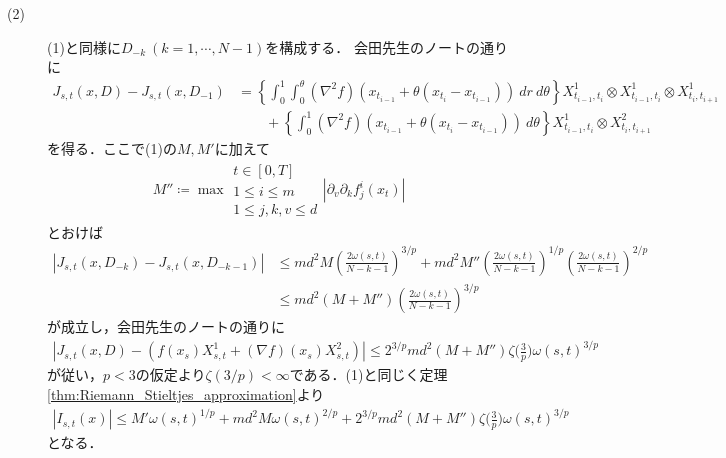 \begin{prf}
\begin{description}
			\item[(2)]
				(1)と同様に$D_{-k}\ (k=1,\cdots,N-1)$を構成する．
				会田先生のノートの通りに
				\begin{align}
					J_{s,t}(x,D) - J_{s,t}(x,D_{-1})
					&= \left\{ \int_0^1 \int_0^\theta (\nabla^2 f)(x_{t_{i-1}} + \theta (x_{t_i}- x_{t_{i-1}}))\ dr\ d\theta \right\}
						X^1_{t_{i-1},t_i} \otimes X^1_{t_{i-1},t_i} \otimes X^1_{t_i,t_{i+1}} \\
						&\qquad + \left\{ \int_0^1 (\nabla^2 f)(x_{t_{i-1}} + \theta (x_{t_i}- x_{t_{i-1}}))\ d\theta \right\}
						X^1_{t_{i-1},t_i} \otimes X^2_{t_i,t_{i+1}}
				\end{align}
				を得る．ここで(1)の$M,M'$に加えて
				\begin{align}
					M'' \coloneqq \max{
					\substack{t \in [0,T] \\ 1 \leq i \leq m \\ 1 \leq j,k,v \leq d}}
					{\left| \partial_v \partial_k f^i_j(x_t) \right|}
				\end{align}
				とおけば
				\begin{align}
					\left| J_{s,t}(x,D_{-k}) - J_{s,t}(x,D_{-k-1}) \right|
					&\leq m d^2 M \left( \frac{2\omega(s,t)}{N-k-1} \right)^{3/p} + m d^2 M'' \left( \frac{2\omega(s,t)}{N-k-1} \right)^{1/p} \left( \frac{2\omega(s,t)}{N-k-1} \right)^{2/p} \\
					&\leq m d^2 (M + M'') \left( \frac{2\omega(s,t)}{N-k-1} \right)^{3/p}
				\end{align}
				が成立し，会田先生のノートの通りに
				\begin{align}
					\left| J_{s,t}(x,D) - \left( f(x_s)X^1_{s,t} + (\nabla f)(x_s)X^2_{s,t} \right) \right|
					\leq 2^{3/p} m d^2 (M+M'') \zeta\biggl(\frac{3}{p}\biggr) \omega(s,t)^{3/p}
				\end{align}
				が従い，$p < 3$の仮定より$\zeta(3/p) < \infty$である．(1)と同じく定理\ref{thm:Riemann_Stieltjes_approximation}より
				\begin{align}
					\left| I_{s,t}(x) \right|
					\leq M' \omega(s,t)^{1/p} + m d^2 M \omega(s,t)^{2/p} + 2^{3/p} m d^2 (M+M'') \zeta\biggl(\frac{3}{p}\biggr) \omega(s,t)^{3/p}
				\end{align}
				となる．
				\QED
		\end{description}
	\end{prf}
	